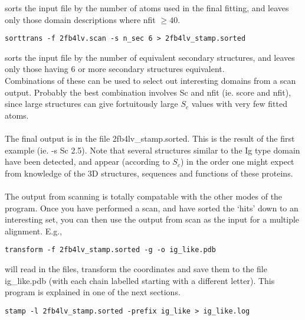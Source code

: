 sorts the input file by the number of atoms used in the final
fitting, and leaves only those domain descriptions where nfit $\geq 40$.\\

\begin{scriptsize}\begin{verbatim}
sorttrans -f 2fb4lv.scan -s n_sec 6 > 2fb4lv_stamp.sorted 
\end{verbatim} \end{scriptsize}

sorts the input file by the number of equivalent secondary 
structures, and leaves only those having $6$ or more secondary
structures equivalent.\\

Combinations of these can be used to select out interesting domains
from a scan output.  Probably the best combination involves Sc and
nfit (ie. score and nfit), since large structures can give
fortuitously large $S_{c}$ values with very few fitted atoms.\\
\\
The final output is in the file 2fb4lv\_stamp.sorted.  This is
the result of the first example (ie. -s Sc 2.5).
Note that several structures similar to the Ig type domain have
been detected, and appear (according to $S_{c}$) in the order one 
might expect from knowledge of the 3D structures, sequences and
functions of these proteins.    \\
\\
The output from scanning is totally compatable with the other modes of 
the program.  Once you have performed a scan, and have sorted the 
`hits' down to an interesting set, you can then use the output from 
scan as the input for a multiple alignment.  E.g.,\\

\begin{scriptsize}\begin{verbatim}
transform -f 2fb4lv_stamp.sorted -g -o ig_like.pdb
\end{verbatim} \end{scriptsize}

will read in the files, transform the coordinates and save them to
the file ig\_like.pdb (with each chain labelled starting with a different
letter).  This program is explained in one of the next sections.\\

\begin{scriptsize}\begin{verbatim}
stamp -l 2fb4lv_stamp.sorted -prefix ig_like > ig_like.log
\end{verbatim} \end{scriptsize}

